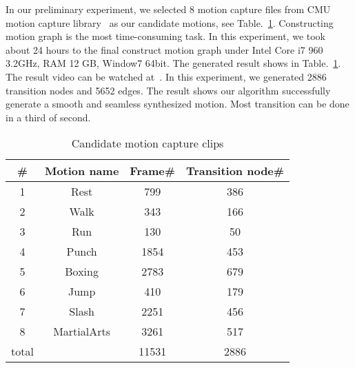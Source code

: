 In our preliminary experiment, we selected 8 motion capture files from CMU motion capture library~\cite{cmu} 
as our candidate motions, see Table.~\ref{table:motionlist}.
Constructing motion graph is the most time-consuming task. In this experiment, 
we took about 24 hours to the final construct motion graph under Intel Core i7 960 3.2GHz, RAM 12 GB, Window7 64bit.
The generated result shows in Table.~\ref{table:motionlist}. 
The result video can be watched at~\cite{video}.
In this experiment, we generated 2886 transition nodes and 5652 edges. 
The result shows our algorithm successfully generate a smooth and seamless 
synthesized motion. Most transition can be done in a third of second.


\begin{table}[ht]
\caption{Candidate motion capture clips}
\centering
\begin{tabular}{c c c c} 
\hline\hline 
\# & Motion name & Frame\# & Transition node# \\ [0.5ex] %
\hline %
1 & Rest & 799 & 386 \\ %
2 & Walk & 343 & 166 \\
3 & Run & 130 & 50 \\
4 & Punch & 1854 & 453 \\
5 & Boxing & 2783 & 679 \\
6 & Jump & 410 & 179 \\
7 & Slash & 2251 & 456 \\
8 & MartialArts & 3261 & 517 \\ [1ex]
\hline %
total &  & 11531 & 2886 \\ [1ex]
\hline
\end{tabular}
\label{table:motionlist} %
\end{table}
